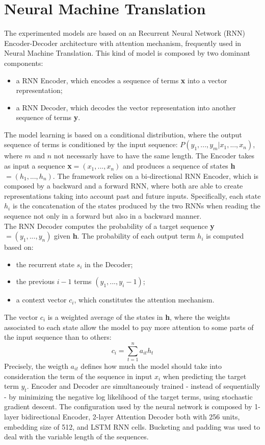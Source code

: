
\section{Neural Machine Translation}
The experimented models are based on an Recurrent Neural Network (RNN) Encoder-Decoder
architecture with attention mechanism, frequently used in Neural Machine Translation. This kind of model is composed by two
dominant components:

\begin{itemize}
    \item a RNN Encoder, which encodes a sequence of terms \textbf{x} into a vector representation;
    \item a RNN Decoder, which decodes the vector representation into another sequence of terms \textbf{y}.
\end{itemize}

The model learning is based on a conditional distribution, where the output sequence of terms is conditioned
by the input sequence: \(P(y_1,...,y_m|x_1,...,x_n)\), where \(m\) and \(n\) not necessarly have to have the same length.
The Encoder takes as input a sequence \textbf{x}\(= (x_1,...,x_n)\) and produces
a sequence of states \textbf{h}\(= (h_1,...,h_n)\). The framework relies on a bi-directional
RNN Encoder, which is composed by a backward and a forward RNN, where both are able to create representations taking into account
past and future inputs. Specifically, each state \(h_i\) is the concatenation of the states produced by 
the two RNNs when reading the sequence not only in a forward but also in a backward manner.\\
The RNN Decoder computes the probability of a target sequence \textbf{y}\(= (y_1,...,y_n)\) given \textbf{h}. The probability
of each output term \(h_i\) is computed based on:
\begin{itemize}
    \item the recurrent state \(s_i\) in the Decoder;
    \item the previous \(i - 1\) terms \((y_1,...,y_i-1)\);
    \item a context vector \(c_i\), which constitutes the attention mechanism.
\end{itemize}
The vector \(c_i\) is a weighted average of the states in \textbf{h}, where the weights associated 
to each state allow the model to pay more attention to some parts of the input sequence than to others:
\[c_i = \sum_{t=1}^n a_{it} h_t\]
Precisely, the weigth \(a_{it}\) defines how much the model should take into consideration the term of the sequence in input \(x_i\)
when predicting the target term \(y_t\). Encoder and Decoder are simultaneously trained - instead of sequentially - by minimizing
the negative log likelihood of the target terms, using stochastic gradient descent.
The configuration used by the neural network is composed by 1-layer bidirectional Encoder, 
2-layer Attention Decoder both with 256 units, embedding size of 512, 
and LSTM RNN cells. Bucketing and padding was used to deal with the variable length of the sequences.


